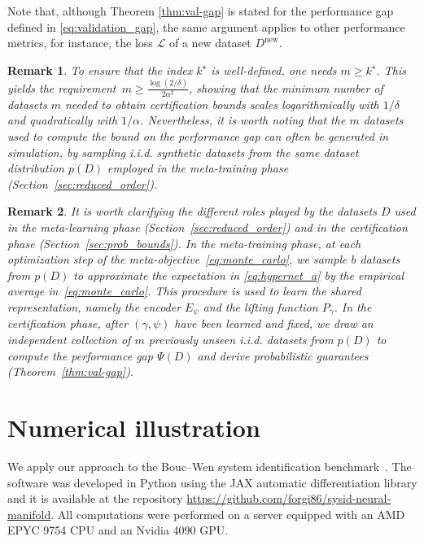 \documentclass{article}
\newcommand{\loss}{\mathcal{L}}
\newcommand{\projpar}{\gamma}
\newcommand{\encpar}{\psi}
\newtheorem{remark}{Remark}
\begin{document}
Note that, although Theorem \ref{thm:val-gap} is stated for the  performance gap defined in \eqref{eq:validation_gap}, the same argument applies to other performance metrics, for instance, the loss $\loss$ of a new dataset  $D^{\mathrm{new}}$.

\begin{remark}
To ensure that the index $k^\star$ is well-defined, one needs $m \ge k^\star$.
This yields the requirement~$\displaystyle
m \ge \frac{\log(2/\delta)}{2\alpha^2}$,
showing that the minimum number of datasets $m$ needed to obtain certification bounds scales logarithmically with $1/\delta$ and quadratically with $1/\alpha$. Nevertheless, it is worth noting that the $m$ datasets used to compute the bound on the performance gap can often be generated in simulation, by sampling i.i.d.  synthetic datasets from the same dataset distribution $p(D)$ employed in the meta-training phase (Section~\ref{sec:reduced_order}).
\end{remark}

\begin{remark}
It is worth clarifying the different roles played by the datasets $D$ used in the meta-learning phase (Section~\ref{sec:reduced_order}) and in the certification phase (Section~\ref{sec:prob_bounds}).
In the \emph{meta-training} phase, at each optimization step of the meta-objective~\eqref{eq:monte_carlo}, we sample $b$ datasets from $p(D)$ to approximate the expectation in \eqref{eq:hypernet_a} by the empirical average in~\eqref{eq:monte_carlo}. This procedure is used to learn the shared representation, namely the encoder $E_\encpar$ and the lifting function $P_\projpar$.
In the \emph{certification} phase, after $(\projpar,\encpar)$ have been learned and fixed, we draw an independent collection of $m$ previously unseen i.i.d. datasets from $p(D)$ to compute the performance gap $\Psi(D)$ and derive  probabilistic guarantees (Theorem~\ref{thm:val-gap}).
\end{remark}

\section{Numerical illustration}
\label{sec:examples}
We apply our approach to the Bouc--Wen system identification benchmark~\cite{noel2016hysteretic}.
The software was developed in Python using the JAX automatic differentiation library and it is available at the repository \url{https://github.com/forgi86/sysid-neural-manifold}. All computations were performed on a server equipped with an AMD EPYC 9754 CPU and an Nvidia 4090 GPU.
\end{document}
